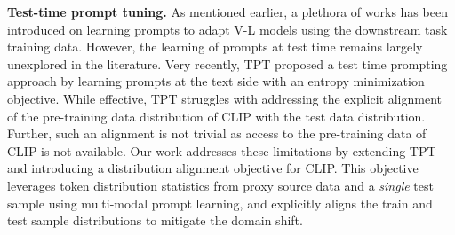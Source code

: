 \documentclass[a4paper]{article}
\begin{document}
\textbf{Test-time prompt tuning.}
As mentioned earlier, a plethora of works has been introduced on learning prompts to adapt V-L models using the downstream task training data. However, the learning of prompts at test time remains largely unexplored in the literature. Very recently, TPT \cite{shu2022test} proposed a test time prompting approach by learning prompts at the text side with an entropy minimization objective. While effective, TPT struggles with addressing the explicit alignment of the pre-training data distribution of CLIP with the test data distribution. Further, such an alignment is not trivial as access to the pre-training data of CLIP is not available. Our work addresses these limitations by extending TPT and introducing a distribution alignment objective for CLIP. This objective leverages token distribution statistics from proxy source data and a \emph{single} test sample using multi-modal prompt learning, %
and  explicitly aligns the train and test sample distributions to mitigate the domain shift.





\end{document}
